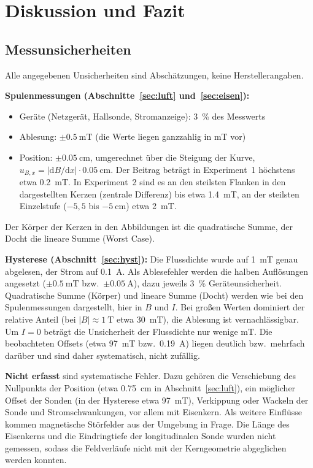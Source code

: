 \documentclass[a4paper,11pt]{article}
\begin{document}
\section{Diskussion und Fazit}

\subsection{Messunsicherheiten}
\label{sec:unsicher}
Alle angegebenen Unsicherheiten sind Abschätzungen, keine Herstellerangaben.

\textbf{Spulenmessungen (Abschnitte~\ref{sec:luft} und~\ref{sec:eisen}):}
\begin{itemize}
  \item Geräte (Netzgerät, Hallsonde, Stromanzeige): \SI{3}{\percent} des Messwerts
  \item Ablesung: $\pm\SI{0.5}{\milli\tesla}$ (die Werte liegen ganzzahlig in
        \si{\milli\tesla} vor)
  \item Position: $\pm\SI{0.05}{\centi\meter}$, umgerechnet über die Steigung der
        Kurve, $u_{B,x}=|\mathrm{d}B/\mathrm{d}x|\cdot\SI{0.05}{\centi\meter}$.
        Der Beitrag beträgt in Experiment~1 höchstens etwa \SI{0.2}{\milli\tesla}.
        In Experiment~2 sind es an den steilsten Flanken in den dargestellten Kerzen
        (zentrale Differenz) bis etwa \SI{1.4}{\milli\tesla}, an der steilsten
        Einzelstufe ($-5{,}5$ bis $-\SI{5}{\centi\meter}$) etwa \SI{2}{\milli\tesla}.
\end{itemize}
Der Körper der Kerzen in den Abbildungen ist die quadratische Summe, der Docht
die lineare Summe (Worst Case).

\textbf{Hysterese (Abschnitt~\ref{sec:hyst}):} Die Flussdichte wurde auf
\SI{1}{\milli\tesla} genau abgelesen, der Strom auf \SI{0.1}{\ampere}. Als
Ablesefehler werden die halben Auflösungen angesetzt
($\pm\SI{0.5}{\milli\tesla}$ bzw.\ $\pm\SI{0.05}{\ampere}$), dazu jeweils
\SI{3}{\percent} Geräteunsicherheit. Quadratische Summe (Körper) und lineare
Summe (Docht) werden wie bei den Spulenmessungen dargestellt, hier in $B$ und $I$.
Bei großen Werten dominiert der relative Anteil (bei
$|B|\approx\SI{1}{\tesla}$ etwa \SI{30}{\milli\tesla}), die Ablesung ist
vernachlässigbar. Um $I=0$ beträgt die Unsicherheit der Flussdichte nur wenige
\si{\milli\tesla}. Die beobachteten Offsets (etwa \SI{97}{\milli\tesla} bzw.\
\SI{0.19}{\ampere}) liegen deutlich bzw.\ mehrfach darüber und sind daher
systematisch, nicht zufällig.

\textbf{Nicht erfasst} sind systematische Fehler. Dazu gehören die Verschiebung
des Nullpunkts der Position (etwa \SI{0.75}{\centi\meter} in
Abschnitt~\ref{sec:luft}), ein möglicher Offset der Sonden (in der Hysterese
etwa \SI{97}{\milli\tesla}), Verkippung oder Wackeln der Sonde und
Stromschwankungen, vor allem mit Eisenkern. Als weitere Einflüsse kommen
magnetische Störfelder aus der Umgebung in Frage. Die Länge des Eisenkerns und
die Eindringtiefe der longitudinalen Sonde wurden nicht gemessen, sodass die
Feldverläufe nicht mit der Kerngeometrie abgeglichen werden konnten.
\end{document}
